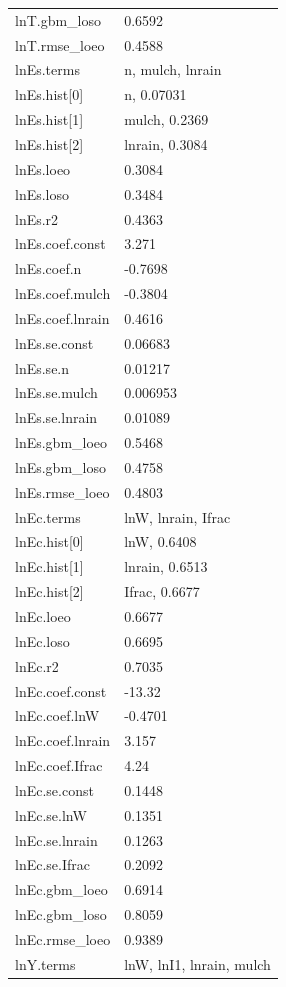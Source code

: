 {\begin{longtable}{p{}p{}}
{}lnT.gbm\_loso & 0.6592\\
{}lnT.rmse\_loeo & 0.4588\\
{}lnEs.terms & n, mulch, lnrain\\
{}lnEs.hist[0] & n, 0.07031\\
{}lnEs.hist[1] & mulch, 0.2369\\
{}lnEs.hist[2] & lnrain, 0.3084\\
{}lnEs.loeo & 0.3084\\
{}lnEs.loso & 0.3484\\
{}lnEs.r2 & 0.4363\\
{}lnEs.coef.const & 3.271\\
{}lnEs.coef.n & -0.7698\\
{}lnEs.coef.mulch & -0.3804\\
{}lnEs.coef.lnrain & 0.4616\\
{}lnEs.se.const & 0.06683\\
{}lnEs.se.n & 0.01217\\
{}lnEs.se.mulch & 0.006953\\
{}lnEs.se.lnrain & 0.01089\\
{}lnEs.gbm\_loeo & 0.5468\\
{}lnEs.gbm\_loso & 0.4758\\
{}lnEs.rmse\_loeo & 0.4803\\
{}lnEc.terms & lnW, lnrain, Ifrac\\
{}lnEc.hist[0] & lnW, 0.6408\\
{}lnEc.hist[1] & lnrain, 0.6513\\
{}lnEc.hist[2] & Ifrac, 0.6677\\
{}lnEc.loeo & 0.6677\\
{}lnEc.loso & 0.6695\\
{}lnEc.r2 & 0.7035\\
{}lnEc.coef.const & -13.32\\
{}lnEc.coef.lnW & -0.4701\\
{}lnEc.coef.lnrain & 3.157\\
{}lnEc.coef.Ifrac & 4.24\\
{}lnEc.se.const & 0.1448\\
{}lnEc.se.lnW & 0.1351\\
{}lnEc.se.lnrain & 0.1263\\
{}lnEc.se.Ifrac & 0.2092\\
{}lnEc.gbm\_loeo & 0.6914\\
{}lnEc.gbm\_loso & 0.8059\\
{}lnEc.rmse\_loeo & 0.9389\\
{}lnY.terms & lnW, lnI1, lnrain, mulch\\

\end{longtable}}

